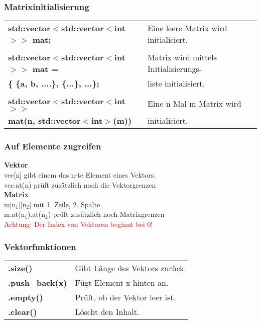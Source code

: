 \documentclass[a3paper, 10pt, landscape]{scrartcl}
\begin{document}
\begin{multicols*}{3}
	\subsubsection{Matrixinitialisierung}
	\begin{tabular}{l l}
		
	\textbf{std::vector$<$std::vector$<$int$>>$ mat;} & Eine leere Matrix wird initialisiert.\\
	\\
	\textbf{std::vector$<$std::vector$<$int$>>$ mat =} & Matrix wird mittels Initialisierungs-\\
	\textbf{\{ \{a, b, ....\}, \{...\}, ...\};} & liste initialisiert. \\
	\\
	\textbf{std::vector$<$std::vector$<$int$>>$} & Eine n Mal m Matrix wird\\
	\textbf{mat(n, std::vector$<$int$>$(m))} & initialisiert.
	
	
	\end{tabular}
	
	\subsubsection{Auf Elemente zugreifen}
	\textbf{Vektor}\\
	vec[n] gibt einem das n-te Element eines Vektors. \\
	vec.at(n) prüft zusätzlich noch die Vektorgrenzen \\
	\textbf{Matrix}\\
	m[n$_1$][n$_2$] mit 1. Zeile, 2. Spalte \\
	m.at(n$_1$).at(n$_2$) prüft zusätzlich noch Matrixgrenzen \\
	\textcolor{red}{Achtung: Der Index von Vektoren beginnt bei 0!}
	
	\subsubsection{Vektorfunktionen}
	\begin{tabular}{l l}
		\textbf{.size()} & Gibt Länge des Vektors zurück \\
		\textbf{.push\_back(x)} & Fügt Element x hinten an. \\
		\textbf{.empty()} & Prüft, ob der Vektor leer ist.\\
		\textbf{.clear()} & Löscht den Inhalt.\\

	\end{tabular}
	

\end{multicols*}
\end{document}
